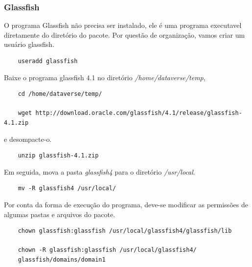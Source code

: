 \documentclass[12pt,hidelinks]{article}
\begin{document}
        \subsubsection{Glassfish}
        
        \qquad O programa Glassfish não precisa ser instalado, ele é uma programa executavel diretamente do diretório do pacote. Por questão de organização, vamos criar um usuário glassfish.
        \begin{verbatim}
    useradd glassfish
        \end{verbatim}
        
        Baixe o programa glassfish 4.1 no diretório \textit{/home/dataverse/temp},
        \begin{verbatim}
    cd /home/dataverse/temp/
    
    wget http://download.oracle.com/glassfish/4.1/release/glassfish-4.1.zip
        \end{verbatim}
        e desompacte-o.
        \begin{verbatim}
    unzip glassfish-4.1.zip
        \end{verbatim}  
        
        Em seguida, mova a pasta \textit{glassfish4} para o diretório \textit{/usr/local}.
        \begin{verbatim}
    mv -R glassfish4 /usr/local/
        \end{verbatim}
        Por conta da forma de execução do programa, deve-se modificar as permissões de algumas pastas e arquivos do pacote.
        \begin{verbatim}
    chown glassfish:glassfish /usr/local/glassfish4/glassfish/lib
    
    chown -R glassfish:glassfish /usr/local/glassfish4/
    glassfish/domains/domain1
        \end{verbatim}
        
\end{document}
